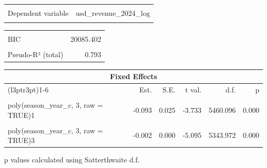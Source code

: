 \documentclass[
  12pt]{article}
\begin{document}
\begin{table}[!h]
\centering
\begin{tabular}{lr}
\toprule
\cellcolor{gray!10}{Observations} & \cellcolor{gray!10}{7023}\\
Dependent variable & usd\_revenue\_2024\_log\\
\cellcolor{gray!10}{Type} & \cellcolor{gray!10}{Mixed effects linear regression}\\
\bottomrule
\end{tabular}
\end{table} \begin{table}[!h]
\centering
\begin{tabular}{lr}
\toprule
\cellcolor{gray!10}{AIC} & \cellcolor{gray!10}{20037.404}\\
BIC & 20085.402\\
\cellcolor{gray!10}{Pseudo-R² (fixed effects)} & \cellcolor{gray!10}{0.007}\\
Pseudo-R² (total) & 0.793\\
\bottomrule
\end{tabular}
\end{table} \begin{table}[!h]
\centering
\begin{threeparttable}
\begin{tabular}{lrrrrr}
\toprule
\multicolumn{6}{c}{Fixed Effects} \\
\cmidrule(l{3pt}r{3pt}){1-6}
  & Est. & S.E. & t val. & d.f. & p\\
\midrule
\cellcolor{gray!10}{(Intercept)} & \cellcolor{gray!10}{15.993} & \cellcolor{gray!10}{0.076} & \cellcolor{gray!10}{211.563} & \cellcolor{gray!10}{39.594} & \cellcolor{gray!10}{0.000}\\
poly(season\_year\_c, 3, raw = TRUE)1 & -0.093 & 0.025 & -3.733 & 5460.096 & 0.000\\
\cellcolor{gray!10}{poly(season\_year\_c, 3, raw = TRUE)2} & \cellcolor{gray!10}{0.022} & \cellcolor{gray!10}{0.005} & \cellcolor{gray!10}{4.153} & \cellcolor{gray!10}{5343.577} & \cellcolor{gray!10}{0.000}\\
poly(season\_year\_c, 3, raw = TRUE)3 & -0.002 & 0.000 & -5.095 & 5343.972 & 0.000\\
\bottomrule
\end{tabular}
\begin{tablenotes}
\item  p values calculated using Satterthwaite d.f. 
\end{tablenotes}
\end{threeparttable}

\end{table}
\end{document}
